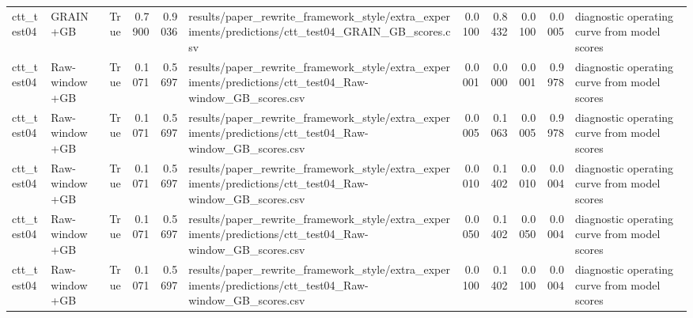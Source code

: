 \begin{tabular}{llrrrlrrrrl}
ctt\_test04 & GRAIN+GB & True & 0.7900 & 0.9036 & results/paper\_rewrite\_framework\_style/extra\_experiments/predictions/ctt\_test04\_GRAIN\_GB\_scores.csv & 0.0100 & 0.8432 & 0.0100 & 0.0005 & diagnostic operating curve from model scores \\
ctt\_test04 & Raw-window+GB & True & 0.1071 & 0.5697 & results/paper\_rewrite\_framework\_style/extra\_experiments/predictions/ctt\_test04\_Raw-window\_GB\_scores.csv & 0.0001 & 0.0000 & 0.0001 & 0.9978 & diagnostic operating curve from model scores \\
ctt\_test04 & Raw-window+GB & True & 0.1071 & 0.5697 & results/paper\_rewrite\_framework\_style/extra\_experiments/predictions/ctt\_test04\_Raw-window\_GB\_scores.csv & 0.0005 & 0.1063 & 0.0005 & 0.9978 & diagnostic operating curve from model scores \\
ctt\_test04 & Raw-window+GB & True & 0.1071 & 0.5697 & results/paper\_rewrite\_framework\_style/extra\_experiments/predictions/ctt\_test04\_Raw-window\_GB\_scores.csv & 0.0010 & 0.1402 & 0.0010 & 0.0004 & diagnostic operating curve from model scores \\
ctt\_test04 & Raw-window+GB & True & 0.1071 & 0.5697 & results/paper\_rewrite\_framework\_style/extra\_experiments/predictions/ctt\_test04\_Raw-window\_GB\_scores.csv & 0.0050 & 0.1402 & 0.0050 & 0.0004 & diagnostic operating curve from model scores \\
ctt\_test04 & Raw-window+GB & True & 0.1071 & 0.5697 & results/paper\_rewrite\_framework\_style/extra\_experiments/predictions/ctt\_test04\_Raw-window\_GB\_scores.csv & 0.0100 & 0.1402 & 0.0100 & 0.0004 & diagnostic operating curve from model scores \\
\bottomrule
\end{tabular}

